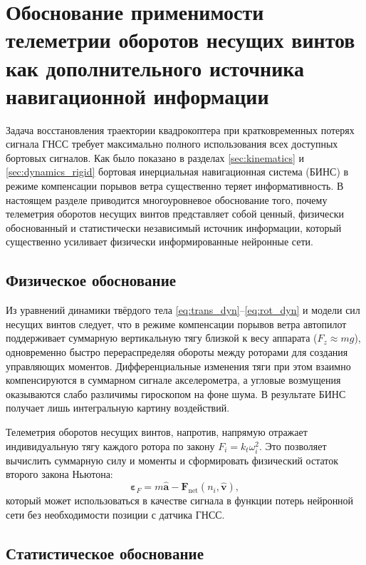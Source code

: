 \section{Обоснование применимости телеметрии оборотов несущих винтов как дополнительного источника навигационной информации}
\label{sec:rpm_justification}

Задача восстановления траектории квадрокоптера при кратковременных потерях сигнала ГНСС требует максимально полного использования всех доступных бортовых сигналов. Как было показано в разделах \ref{sec:kinematics} и \ref{sec:dynamics_rigid} бортовая инерциальная навигационная система (БИНС) в режиме компенсации порывов ветра существенно теряет информативность. В настоящем разделе приводится многоуровневое обоснование того, почему телеметрия оборотов несущих винтов представляет собой ценный, физически обоснованный и статистически независимый источник информации, который существенно усиливает физически информированные нейронные сети.

\subsection{Физическое обоснование}

Из уравнений динамики твёрдого тела \eqref{eq:trans_dyn}--\eqref{eq:rot_dyn} и модели сил несущих винтов следует, что в режиме компенсации порывов ветра автопилот поддерживает суммарную вертикальную тягу близкой к весу аппарата (\(F_z \approx mg\)), одновременно быстро перераспределяя обороты между роторами для создания управляющих моментов. Дифференциальные изменения тяги при этом взаимно компенсируются в суммарном сигнале акселерометра, а угловые возмущения оказываются слабо различимы гироскопом на фоне шума. В результате БИНС получает лишь интегральную картину воздействий.

Телеметрия оборотов несущих винтов, напротив, напрямую отражает индивидуальную тягу каждого ротора по закону \(F_i = k_t \omega_i^2\). Это позволяет вычислить суммарную силу и моменты и сформировать физический остаток второго закона Ньютона:
\begin{equation}
	\boldsymbol{\varepsilon}_F = m \hat{\mathbf{a}} - \mathbf{F}_{\mathrm{net}}(n_i, \hat{\mathbf{v}}),
	\label{eq:physics_residual}
\end{equation}
который может использоваться в качестве сигнала в функции потерь нейронной сети без необходимости позиции с датчика ГНСС.

\subsection{Статистическое обоснование}

